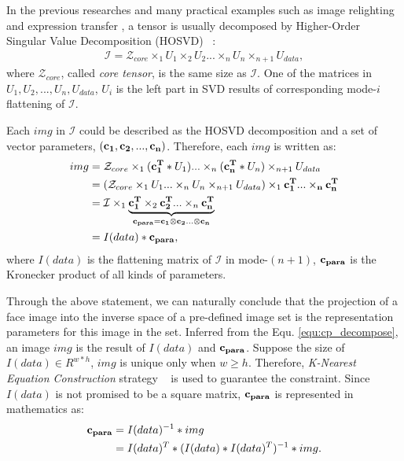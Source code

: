   In the previous researches \cite{VasilescuT03,TPAMI09} and many practical examples such as 
  image relighting \cite{lin05} and expression transfer \cite{Macedo06}, a tensor is usually 
  decomposed by Higher-Order 
  Singular Value Decomposition (HOSVD) ~\cite{Lathauwer00}:
    \begin{equation}
      \begin{aligned}
        \mathcal{I} = \mathcal{Z}_{core} \times_1  U_1  \times_2 U_2 ... \times_n U_n \times_{n+1} U_{data}, 
      \end{aligned}
    \end{equation}
    where $\mathcal{Z}_{core}$, called {\it core tensor}, is the same size as $\mathcal{I}$. One of the 
    matrices in $U_1,U_2,...,U_n,U_{data}$, $U_i$ is the left part in SVD results of corresponding 
    mode-$i$ flattening of $\mathcal{I}$.

  Each $img$ in $\mathcal{I}$ could be described as the HOSVD decomposition and a set of vector parameters, 
  $({\bf c_1,c_2,...,c_n})$. Therefore, each $img$ is written
  as:
    \begin{equation}
    \label{equ:cp_decompose}
      \begin{aligned}
        img & = \mathcal{Z}_{core} \times_1  ({\bf c_1^T}*U_1) ... \times_n ({\bf c_n^T}*U_n) \times_{n+1} U_{data} \\
          & = (\mathcal{Z}_{core} \times_1 U_1 ... \times_n U_n \times_{n+1} U_{data}) \times_1 {\bf c_1^T ... \times_n c_n^T} \\
          & = \mathcal{I} \times_1 \underbrace{ {\bf c_1^T} \times_2 {\bf c_2^T} ... \times_n {\bf c_n^T} }_{ {\bf c_{para} = c_1 \otimes c_2 ... \otimes c_n} }\\
          & = I(data) * {\bf c_{para}}, 
      \end{aligned}
    \end{equation}
    where $I(data)$ is the flattening matrix of $\mathcal{I}$ in mode-$(n+1)$, ${\bf c_{para}}$ is the 
    Kronecker product of all kinds of parameters. 

    Through the above statement, we can naturally conclude that the projection of a face image into the 
    inverse space of a pre-defined image set is the representation parameters for this image in the set. 
    Inferred from the Equ. \ref{equ:cp_decompose}, an image $img$ is the result of $I(data)$ and 
    ${\bf c_{para}}$. Suppose the size of $I(data) \in R^{w*h}$, $img$ is unique only when $w \geq h$. 
    Therefore, {\it K-Nearest Equation Construction} strategy ~\cite{lin05} is used to guarantee the constraint. 
    Since $I(data)$ is not promised to be a square matrix, ${\bf c_{para}}$ is represented in mathematics as:
    \begin{equation}
      \begin{aligned}
        {\bf c_{para}} & = I(data)^{-1} * img\\
                 & = I(data)^T * (I(data)*I(data)^T)^{-1} * img.
      \end{aligned}
    \end{equation}  

